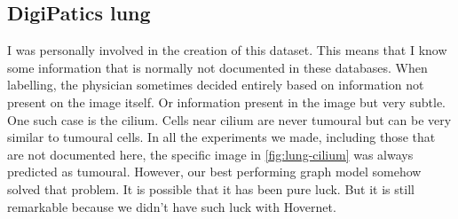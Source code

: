 \newpage
\subsection{DigiPatics lung}

I was personally involved in the creation of this dataset. This means that I know some information that is normally not documented in these databases. When labelling, the physician sometimes decided entirely based on information not present on the image itself. Or information present in the image but very subtle. One such case is the cilium. Cells near cilium are never tumoural but can be very similar to tumoural cells. In all the experiments we made, including those that are not documented here, the specific image in \autoref{fig:lung-cilium} was always predicted as tumoural. However, our best performing graph model somehow solved that problem. It is possible that it has been pure luck. But it is still remarkable because we didn't have such luck with Hovernet.

